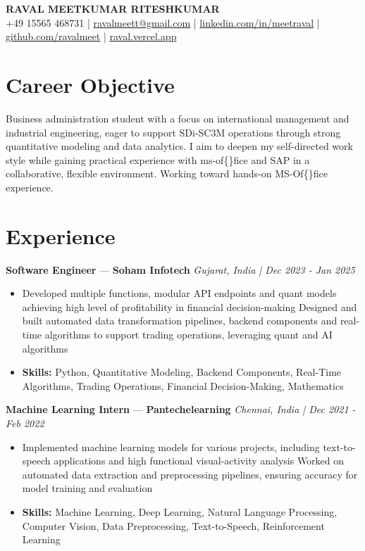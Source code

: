 \documentclass[a4paper,10pt]{article}
\begin{document}
\begin{center}
  {\Large\bfseries RAVAL MEETKUMAR RITESHKUMAR}\\[2pt]
  {\small +49 15565 468731 \;|\; \href{mailto:ravalmeett@gmail.com}{ravalmeett@gmail.com} \;|\; \href{https://www.linkedin.com/in/meetraval/}{linkedin.com/in/meetraval} \;|\; \href{https://github.com/ravalmeet}{github.com/ravalmeet} \;|\; \href{https://raval.vercel.app/}{raval.vercel.app}}
\end{center}
\vspace{-3pt}

\section*{Career Objective}
Business administration student with a focus on international management and industrial engineering, eager to support SDi-SC3M operations through strong quantitative modeling and data analytics. I aim to deepen my self-directed work style while gaining practical experience with ms-of\{\}fice and SAP in a collaborative, flexible environment. Working toward hands-on MS-Of\{\}fice experience.\par

\section*{Experience}
\textbf{Software Engineer} — \textbf{Soham Infotech} \hfill \textit{Gujarat, India \;|\; Dec 2023 - Jan 2025}\par
\vspace{1pt}
\begin{itemize}
  \item Developed multiple functions, modular API endpoints and quant models achieving high level of profitability in financial decision-making Designed and built automated data transformation pipelines, backend components and real-time algorithms to support trading operations, leveraging quant and AI algorithms
  \item \textbf{Skills:} Python, Quantitative Modeling, Backend Components, Real-Time Algorithms, Trading Operations, Financial Decision-Making, Mathematics
\end{itemize}
\vspace{3pt}
\textbf{Machine Learning Intern} — \textbf{Pantechelearning} \hfill \textit{Chennai, India \;|\; Dec 2021 - Feb 2022}\par
\vspace{1pt}
\begin{itemize}
  \item Implemented machine learning models for various projects, including text-to-speech applications and high functional visual-activity analysis Worked on automated data extraction and preprocessing pipelines, ensuring accuracy for model training and evaluation
  \item \textbf{Skills:} Machine Learning, Deep Learning, Natural Language Processing, Computer Vision, Data Preprocessing, Text-to-Speech, Reinforcement Learning
\end{itemize}
\end{document}
